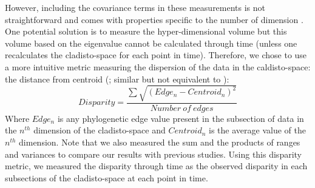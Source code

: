 \documentclass[12pt,letterpaper]{article}
\begin{document}
However, including the covariance terms in these measurements is not straightforward and comes with properties specific to the number of dimension \citep{Jackson,DonohueDim}.
One potential solution is to measure the hyper-dimensional volume \citep{Wills1994,DonohueDim} but this volume based on the eigenvalue cannot be calculated through time (unless one recalculates the cladisto-space for each point in time).
Therefore, we chose to use a more intuitive metric measuring the dispersion of the data in the caldisto-space: the distance from centroid (\citealt{finlay2015morphological}; similar but not equivalent to \citealt{kornextinction2013,huang2015origins}):
\begin{equation}
Disparity=\frac{\sum{\sqrt{(Edge_{n}-Centroid_{n})^2}}}{Number\ of\ edges}
\end{equation}
Where $Edge_{n}$ is any phylogenetic edge value present in the subsection of data in the $n^{th}$ dimension of the cladisto-space and $Centroid_{n}$ is the average value of the $n^{th}$ dimension.
Note that we also measured the sum and the products of ranges and variances to compare our results with previous studies. %
Using this disparity metric, we measured the disparity through time as the observed disparity in each subsections of the cladisto-space at each point in time.
\end{document}
